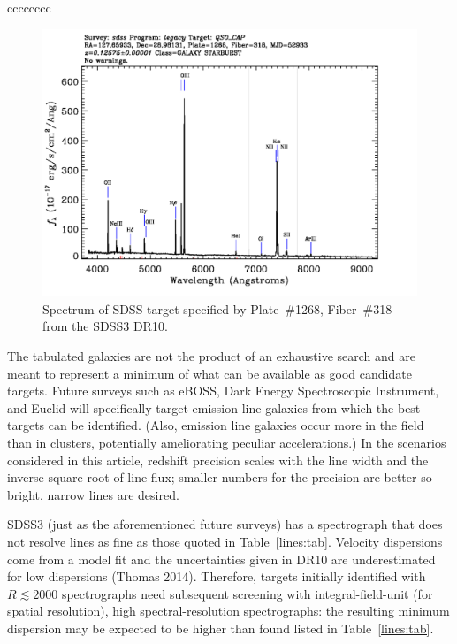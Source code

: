 \documentclass[preprint2, 10pt]{aastex}
\begin{document}
{\begin{deluxetable}{cccccccc}
\enddata
\end{deluxetable}


\begin{figure}[t]
   \centering
    \includegraphics[width=\columnwidth]{SpecById.pdf} 
   \caption{Spectrum of SDSS target specified by Plate~\#1268, Fiber~\#318 from the SDSS3 DR10.  \label{shsinput:fig}}
\end{figure}


The tabulated galaxies are not the product of an exhaustive search and are meant to represent a minimum of what can be available
as good
candidate targets.
Future surveys such as eBOSS, Dark Energy Spectroscopic Instrument, and Euclid will specifically target emission-line
galaxies from which the best targets can be identified.
(Also, emission line galaxies occur more in the field than in clusters, potentially ameliorating peculiar accelerations.)  In the scenarios considered in this article, redshift precision scales
with the 
line width and the inverse square root of line flux; smaller numbers 
for the precision are better so bright, narrow lines 
are desired. 


SDSS3 (just as the aforementioned future surveys) has a spectrograph that does
not resolve lines as fine as those quoted in Table~\ref{lines:tab}.  Velocity dispersions come
from a model fit and the uncertainties given in DR10 are underestimated for low dispersions (Thomas 2014). 
Therefore, targets initially identified with $R\lesssim 2000$ spectrographs need subsequent screening with
integral-field-unit (for spatial resolution),
high spectral-resolution  spectrographs: the resulting minimum dispersion may be expected to be higher
than found listed in Table~\ref{lines:tab}.


}
\end{document}
